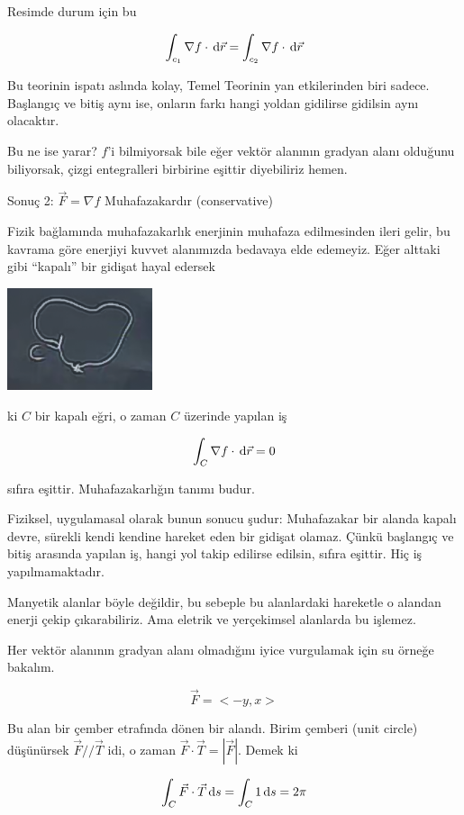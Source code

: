 \documentclass[12pt,fleqn]{article}\usepackage{../../common}
\begin{document}
Resimde durum için bu

$$ \int_{c_1}\nabla f \cdot \,\mathrm{d}\vec{r} =  \int_{c_2}\nabla f \cdot \,\mathrm{d}\vec{r} $$

Bu teorinin ispatı aslında kolay, Temel Teorinin yan etkilerinden biri
sadece. Başlangıç ve bitiş aynı ise, onların farkı hangi yoldan gidilirse
gidilsin aynı olacaktır.

Bu ne ise yarar? $f$'i bilmiyorsak bile eğer vektör alanının gradyan alanı
olduğunu biliyorsak, çizgi entegralleri birbirine eşittir diyebiliriz hemen. 

Sonuç 2: $\vec{F} = \nabla f$ Muhafazakardır (conservative)

Fizik bağlamında muhafazakarlık enerjinin muhafaza edilmesinden ileri
gelir, bu kavrama göre enerjiyi kuvvet alanımızda bedavaya elde
edemeyiz. Eğer alttaki gibi ``kapalı'' bir gidişat hayal edersek

\includegraphics[height=3cm]{20_8.png}

ki $C$ bir kapalı eğri, o zaman $C$ üzerinde yapılan iş

$$ \int_{C}\nabla f \cdot \,\mathrm{d}\vec{r} = 0$$

sıfıra eşittir. Muhafazakarlığın tanımı budur. 

Fiziksel, uygulamasal olarak bunun sonucu şudur: Muhafazakar bir alanda
kapalı devre, sürekli kendi kendine hareket eden bir gidişat olamaz. Çünkü
başlangıç ve bitiş arasında yapılan iş, hangi yol takip edilirse edilsin,
sıfıra eşittir. Hiç iş yapılmamaktadır. 

Manyetik alanlar böyle değildir, bu sebeple bu alanlardaki hareketle o
alandan enerji çekip çıkarabiliriz. Ama eletrik ve yerçekimsel alanlarda bu
işlemez. 

Her vektör alanının gradyan alanı olmadığını iyice vurgulamak için su
örneğe bakalım. 

$$ \vec{F} = <-y,x> $$

Bu alan bir çember etrafında dönen bir alandı. Birim çemberi (unit circle)
düşünürsek $\vec{F} // \vec{T}$ idi, o zaman $\vec{F}\cdot\vec{T} =
|\vec{F}|$. Demek ki

$$ \int_C \vec{F}\cdot\vec{T} \,\mathrm{d} s = \int_C 1 \,\mathrm{d} s = 2\pi $$
\end{document}
